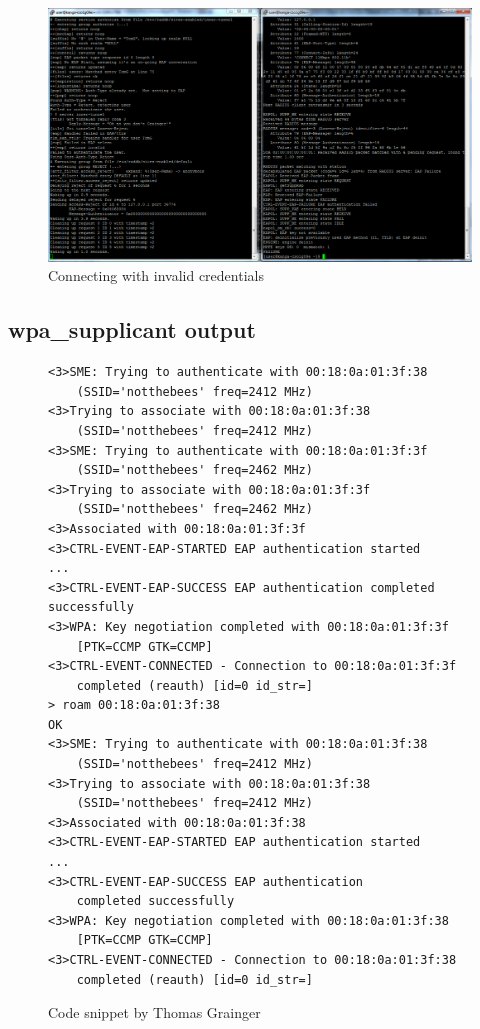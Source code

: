 \documentclass[12pt,a4paper,titlepage]{article}
\begin{document}
\begin{figure}[h!]
\centering
\includegraphics[scale=0.3]{./images/simulation/test3.png}
\caption{Connecting with invalid credentials}
\end{figure}

\subsection{wpa\_supplicant output}
\begin{figure}[h!]
\begin{Verbatim}[frame=single]
<3>SME: Trying to authenticate with 00:18:0a:01:3f:38
	(SSID='notthebees' freq=2412 MHz)
<3>Trying to associate with 00:18:0a:01:3f:38
	(SSID='notthebees' freq=2412 MHz)
<3>SME: Trying to authenticate with 00:18:0a:01:3f:3f
	(SSID='notthebees' freq=2462 MHz)
<3>Trying to associate with 00:18:0a:01:3f:3f
	(SSID='notthebees' freq=2462 MHz)
<3>Associated with 00:18:0a:01:3f:3f
<3>CTRL-EVENT-EAP-STARTED EAP authentication started
...
<3>CTRL-EVENT-EAP-SUCCESS EAP authentication completed successfully
<3>WPA: Key negotiation completed with 00:18:0a:01:3f:3f
	[PTK=CCMP GTK=CCMP]
<3>CTRL-EVENT-CONNECTED - Connection to 00:18:0a:01:3f:3f
	completed (reauth) [id=0 id_str=]
> roam 00:18:0a:01:3f:38
OK
<3>SME: Trying to authenticate with 00:18:0a:01:3f:38
	(SSID='notthebees' freq=2412 MHz)
<3>Trying to associate with 00:18:0a:01:3f:38
	(SSID='notthebees' freq=2412 MHz)
<3>Associated with 00:18:0a:01:3f:38
<3>CTRL-EVENT-EAP-STARTED EAP authentication started
...
<3>CTRL-EVENT-EAP-SUCCESS EAP authentication
	completed successfully
<3>WPA: Key negotiation completed with 00:18:0a:01:3f:38
	[PTK=CCMP GTK=CCMP]
<3>CTRL-EVENT-CONNECTED - Connection to 00:18:0a:01:3f:38
	completed (reauth) [id=0 id_str=]
\end{Verbatim}
\caption{Code snippet by Thomas Grainger}
\end{figure}
\end{document}
